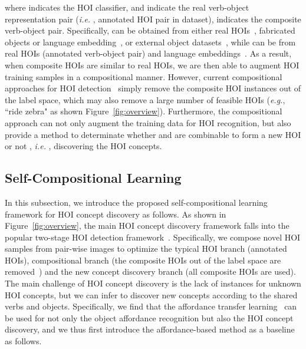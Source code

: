 \documentclass[runningheads]{llncs}
\newcommand{\ie}{\textit{i.e. }}
\newcommand{\eg}{\textit{e.g.}}
\begin{document}
where  indicates the HOI classifier,  and  indicate the real verb-object representation pair (\ie, annotated HOI pair in dataset),   indicates the composite verb-object pair. Specifically,  can be obtained from either real HOIs~\cite{hou2020visual}, fabricated objects or language embedding~\cite{hou2021fcl,bansal2020detecting,preye2019detecting}, or external object datasets~\cite{hou2021atl}, while  can be from real HOIs (annotated verb-object pair) and language embeddings~\cite{kato2018compositional,preye2019detecting}. As a result, when composite HOIs are similar to real HOIs, we are then able to augment HOI training samples in a compositional manner. However, current compositional approaches for HOI detection~\cite{hou2020visual,hou2021atl} simply remove the composite HOI instances out of the label space, which may also remove a large number of feasible HOIs (\eg, ``ride zebra" as shown Figure~\ref{fig:overview}). Furthermore, the compositional approach can not only augment the training data for HOI recognition, but also provide a method to determinate whether  and  are combinable to form a new HOI or not \cite{hou2021atl}, \ie, discovering the HOI concepts.


\subsection{Self-Compositional Learning}

In this subsection, we introduce the proposed self-compositional learning framework for HOI concept discovery as follows. As shown in Figure~\ref{fig:overview}, the main HOI concept discovery framework falls into the popular two-stage HOI detection framework~\cite{hou2020visual}.
Specifically, we compose novel HOI samples from pair-wise images to optimize the typical HOI branch (annotated HOIs), compositional branch (the composite HOIs out of the label space are removed~\cite{hou2020visual,hou2021atl}) and the new concept discovery branch (all composite HOIs are used).
The main challenge of HOI concept discovery is the lack of instances for unknown HOI concepts, but we can infer to discover new concepts according to the shared verbs and objects. Specifically, we find that the affordance transfer learning~\cite{hou2021atl} can be used for not only the object affordance recognition but also the HOI concept discovery, and we thus first introduce the affordance-based method as a baseline as follows.
\end{document}
